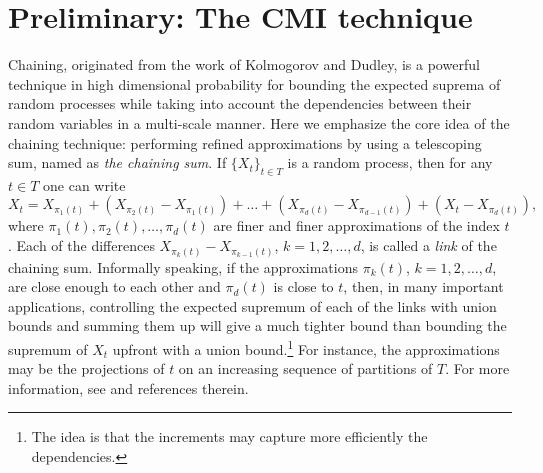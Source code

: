 \documentclass{article}
\begin{document}
\section{Preliminary: The CMI technique}
Chaining, originated from the work of Kolmogorov and Dudley, is a powerful technique in high dimensional probability for bounding the expected suprema of random processes while  taking into account the dependencies between their random variables in a multi-scale manner. Here we emphasize the core idea of the chaining technique: performing refined approximations by using a  telescoping sum, named as \emph{the chaining sum}. If $\{X_t\}_{t\in T}$ is a random process, then for any $t\in T$ one can write
 \begin{equation}
 	X_t=X_{\pi_1(t)}+\left(X_{\pi_2(t)}-X_{\pi_1(t)} \right)+\dots+ \left(X_{\pi_d(t)} -X_{\pi_{d-1}(t)} \right) + \left(X_{t}-X_{\pi_d(t)} \right),\nonumber
 \end{equation}
 where $\pi_1(t), \pi_2(t), \dots, \pi_d(t)$ are finer and finer approximations of the index $t$. Each of the differences $X_{\pi_k(t)}-X_{\pi_{k-1}(t)}$, $k=1,2,\dots, d$, is called a \emph{link} of the chaining sum. Informally speaking, if the approximations $\pi_k(t)$, $k=1,2,\dots, d$, are close enough to each other and $\pi_d(t)$ is close to $t$, then, in many important applications, controlling the expected supremum of each of the links with union bounds and summing them up will give a much tighter bound than bounding the supremum of $X_t$ upfront with a union bound.\footnote{The idea is that the increments may capture more efficiently 
 the dependencies.} 
 For instance, the approximations may be the projections of $t$ on an increasing sequence of partitions
   of $T$. For more information,  
  see \cite{Ramon, Vershynin, talagrand2014upper} and references therein. 
 
\end{document}
